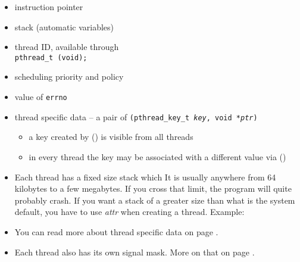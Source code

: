 \begin{slide}
\begin{itemize}
\item instruction pointer
\item stack (automatic variables)
\item thread ID, available through\\
\texttt{pthread\_t (void);}
\item scheduling priority and policy
\item value of \texttt{errno}
\item thread specific data -- a pair of
\texttt{(pthread\_key\_t \emph{key}, void *\emph{ptr})} 
    \begin{itemize}
    \item a key created by () is visible from all
    threads
    \item in every thread the key may be associated with a different value via
    ()
    \end{itemize}
\end{itemize}
\end{slide}

\begin{itemize}
\item Each thread has a fixed size stack which   It is usually anywhere from 64 kilobytes to a few megabytes.  If you
cross that limit, the program will quite probably crash.  If you want a stack of
a greater size than what is the system default, you have to use \emph{attr} when
creating a thread.  Example: 
\item You can read more about thread specific data on page
\pageref{THREAD_SPECIFIC_DATA}.
\item Each thread also has its own signal mask.  More on that on page
\pageref{PTHREADSIGMASK}.
\end{itemize}



